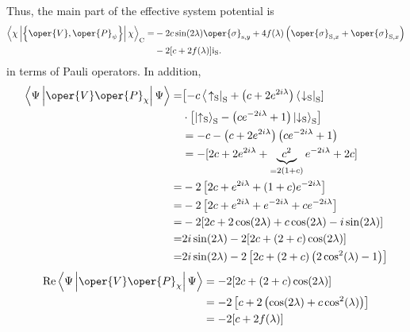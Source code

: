 Thus, the main part of the effective system potential is
\begin{equation}
\begin{aligned}
\left\langle\chi\left|\left\{\oper{V}, \oper{P}_\psi\right\}\right| \chi\right\rangle_{\mathrm{C}}= & -2 c \sin (2 \lambda) \oper{\sigma}_{\mathrm{s}, y}+4 f(\lambda)\left(\oper{\sigma}_{\mathrm{S}, x}+\oper{\sigma}_{\mathrm{S}, x}\right) \\
& -2[c+2 f(\lambda)] \mathrm{i}_{\mathrm{S}} .
\end{aligned}
\end{equation}
in terms of Pauli operators. In addition,
\begin{equation}
\begin{aligned}
\left\langle\Psi\left|\oper{V} \oper{P}_\chi\right| \Psi\right\rangle= & {\left[-c\left\langle\left.\uparrow_{\mathrm{S}}\right|_{\mathrm{S}}+\left(c+2 e^{2 i \lambda}\right)\left\langle\left.\downarrow_{\mathrm{S}}\right|_{\mathrm{S}}\right]\right.\right.} \\
& \cdot\left[\left|\uparrow_{\mathrm{S}}\right\rangle_{\mathrm{S}}-\left(c e^{-2 i \lambda}+1\right)\left|\downarrow_{\mathrm{S}}\right\rangle_{\mathrm{S}}\right] \\
& =-c-\left(c+2 e^{2 i \lambda}\right)\left(c e^{-2 i \lambda}+1\right) \\
& =-[2 c+2 e^{2 i \lambda}+\underbrace{c^2}_{=2(1+c)} e^{-2 i \lambda}+2 c] \\
= & -2\left[2 c+e^{2 i \lambda}+(1+c) e^{-2 i \lambda}\right] \\
= & -2\left[2 c+e^{2 i \lambda}+e^{-2 i \lambda}+c e^{-2 i \lambda}\right] \\
= & -2[2 c+2 \cos (2 \lambda)+c \cos (2 \lambda)-i \sin (2 \lambda)] \\
= & 2 i \sin (2 \lambda)-2[2 c+(2+c) \cos (2 \lambda)] \\
= & 2 i \sin (2 \lambda)-2\left[2 c+(2+c)\left(2 \cos ^2(\lambda)-1\right)\right]
\end{aligned}
\end{equation}
\begin{equation}
\begin{aligned}
\operatorname{Re}\left\langle\Psi\left|\oper{V} \oper{P}_\chi\right| \Psi\right\rangle & =-2[2 c+(2+c) \cos (2 \lambda)] \\
& =-2\left[c+2\left(\cos (2 \lambda)+c \cos ^2(\lambda)\right)\right] \\
& =-2[c+2 f(\lambda)]
\end{aligned}
\end{equation}

